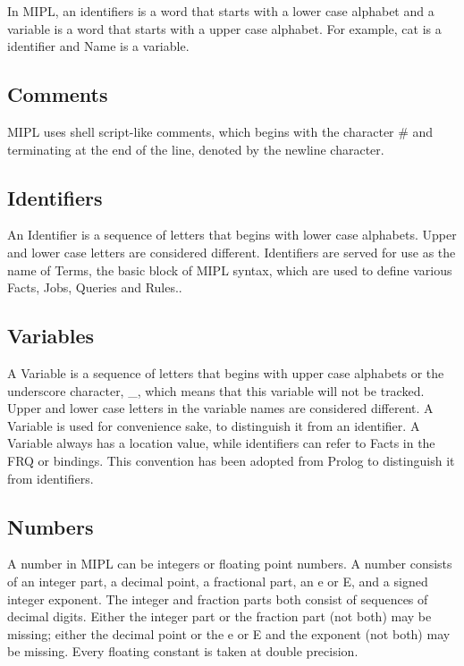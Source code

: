 \documentclass[prodmode,acmtecs]{acmsmall}
\begin{document}
In MIPL, an identifiers is a word that starts with a lower case alphabet
and a variable is a word that starts with a upper case alphabet.  For
example, cat is a identifier and Name is a variable.
\medskip

\subsection{Comments}

MIPL uses shell script-like comments, which begins with the character
\# and terminating at the end of the line, denoted by the newline character.
\medskip

\subsection{Identifiers}

An Identifier is a sequence of letters that begins with lower case alphabets.
Upper and lower case letters are considered different.   Identifiers are
served for use as the name of Terms, the basic block of MIPL syntax, which 
are used to define various Facts, Jobs, Queries and Rules..
\medskip

\subsection{Variables}

A Variable is a sequence of letters that begins with upper case alphabets
or the underscore character, \_, which means that this variable will not
be tracked.  Upper and lower case letters in the variable names are
considered different. A Variable is used for convenience sake, to distinguish
it from an identifier. A Variable always has a location value, while identifiers
can refer to Facts in the FRQ or bindings. This convention has been adopted from 
Prolog to distinguish it from identifiers.
\medskip

\subsection{Numbers}

A number in MIPL can be integers or floating point numbers.  A number consists of
an integer part, a decimal point, a fractional part, an e or E, and a signed 
integer exponent. The integer and fraction parts both consist of sequences of decimal
digits.
Either the integer part or the fraction part (not both) may be missing; either 
the decimal point or the e or E and the exponent (not both) may be missing.
Every floating constant is taken at double precision.
\medskip
\end{document}
